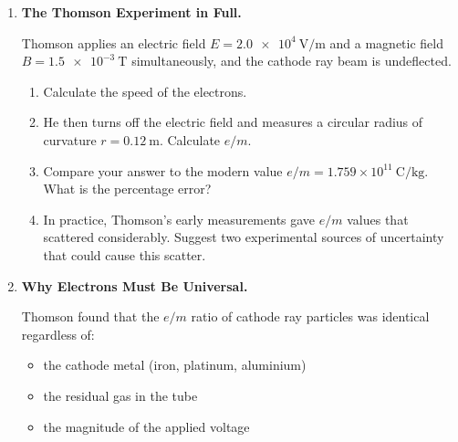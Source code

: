 \documentclass[12pt, a4paper]{book}
\theoremstyle{definition}
\begin{document}
\begin{deepbox}
\begin{enumerate}[label=\textbf{D\arabic*.}]

  \item \textbf{The Thomson Experiment in Full.}

        Thomson applies an electric field $E = \SI{2.0e4}{\volt\per\metre}$
        and a magnetic field $B = \SI{1.5e-3}{\tesla}$
        simultaneously, and the cathode ray beam is undeflected.

        \begin{enumerate}[label=(\alph*)]
          \item Calculate the speed of the electrons.
          \item He then turns off the electric field and measures
                a circular radius of curvature $r = \SI{0.12}{\metre}$.
                Calculate $e/m$.
          \item Compare your answer to the modern value
                $e/m = 1.759 \times 10^{11}\ \si{\coulomb\per\kilogram}$.
                What is the percentage error?
          \item In practice, Thomson's early measurements
                gave $e/m$ values that scattered considerably.
                Suggest two experimental sources of uncertainty
                that could cause this scatter.
        \end{enumerate}

  \item \textbf{Why Electrons Must Be Universal.}

        Thomson found that the $e/m$ ratio of cathode ray particles
        was identical regardless of:
        \begin{itemize}[nosep]
          \item the cathode metal (iron, platinum, aluminium)
          \item the residual gas in the tube
          \item the magnitude of the applied voltage
        \end{itemize}


\end{enumerate}
\end{deepbox}
\end{document}
